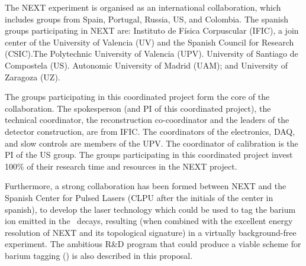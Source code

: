 The NEXT experiment is organised as an international collaboration, which includes groups from Spain, Portugal, Russia, US, and Colombia. The spanish groups participating in NEXT are: Instituto de Física Corpuscular (IFIC), a join center of the University of Valencia (UV) and the Spanish Council for Research (CSIC).The  Polytechnic University of Valencia (UPV). University of Santiago de Compostela (US). Autonomic University of Madrid (UAM); and University of Zaragoza (UZ). 

The groups participating in this coordinated project form the core of the collaboration. The spokesperson (and PI of this coordinated project), the technical coordinator, the reconstruction co-coordinator and the leaders of the detector construction, are from IFIC. The coordinators of the electronics, DAQ, and slow controls are members of the UPV. The coordinator of calibration is the PI  of the US group. The groups participating in this coordinated project invest 100\% of their research time and resources in the NEXT project. 

Furthermore, a strong collaboration has been  formed between NEXT and the Spanish Center for Pulsed Lasers (CLPU after the initials of the center in spanish), to develop the laser technology which could be used to tag the barium ion emitted in the \bb\ decays, resulting (when combined with the excellent energy resolution of NEXT and its topological signature) in a virtually background-free experiment. The ambitious R\&D program that could produce a viable scheme for barium tagging (\BATA) is also described in this proposal.  

%



